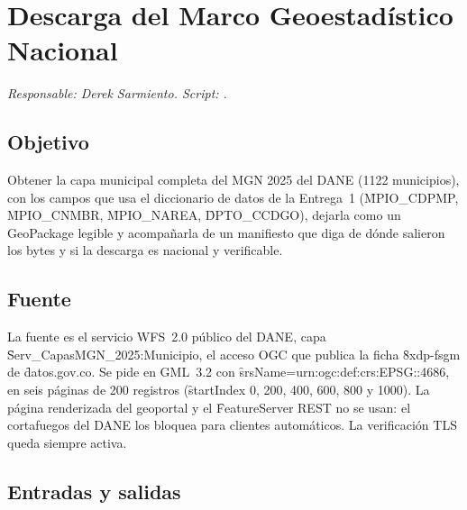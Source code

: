 \section{Descarga del Marco Geoestadístico Nacional}\label{sec:descarga}

\textit{Responsable: Derek Sarmiento. Script: .}

\subsection{Objetivo}

Obtener la capa municipal completa del MGN 2025 del DANE (1122 municipios), con los campos que usa el diccionario de datos de la Entrega~1 (\f{MPIO\_CDPMP}, \f{MPIO\_CNMBR}, \f{MPIO\_NAREA}, \f{DPTO\_CCDGO}), dejarla como un GeoPackage legible y acompañarla de un manifiesto que diga de dónde salieron los bytes y si la descarga es nacional y verificable.

\subsection{Fuente}

La fuente es el servicio WFS~2.0 público del DANE, capa \f{Serv\_CapasMGN\_2025:Municipio}, el acceso OGC que publica la ficha \f{8xdp-fsgm} de \f{datos.gov.co}. Se pide en GML~3.2 con \f{srsName=urn:ogc:def:crs:EPSG::4686}, en seis páginas de 200 registros (\f{startIndex} 0, 200, 400, 600, 800 y 1000). La página renderizada del geoportal y el \f{FeatureServer} REST no se usan: el cortafuegos del DANE los bloquea para clientes automáticos. La verificación TLS queda siempre activa.

\subsection{Entradas y salidas}

